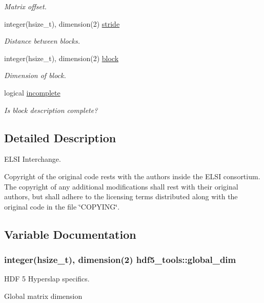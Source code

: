 \begin{DoxyCompactItemize}
\begin{DoxyCompactList}\small\item\em Matrix offset. \end{DoxyCompactList}\item 
\hypertarget{namespacehdf5__tools_ac27d32db7d4f517455a874f695763a58}{}integer(hsize\+\_\+t), dimension(2) \hyperlink{namespacehdf5__tools_ac27d32db7d4f517455a874f695763a58}{stride}\label{namespacehdf5__tools_ac27d32db7d4f517455a874f695763a58}

\begin{DoxyCompactList}\small\item\em Distance between blocks. \end{DoxyCompactList}\item 
\hypertarget{namespacehdf5__tools_a1bd5d44d2bbdd65cdbf723c7f3520999}{}integer(hsize\+\_\+t), dimension(2) \hyperlink{namespacehdf5__tools_a1bd5d44d2bbdd65cdbf723c7f3520999}{block}\label{namespacehdf5__tools_a1bd5d44d2bbdd65cdbf723c7f3520999}

\begin{DoxyCompactList}\small\item\em Dimension of block. \end{DoxyCompactList}\item 
\hypertarget{namespacehdf5__tools_adf2df1e36a8daa71e328d9988ea3e6c3}{}logical \hyperlink{namespacehdf5__tools_adf2df1e36a8daa71e328d9988ea3e6c3}{incomplete}\label{namespacehdf5__tools_adf2df1e36a8daa71e328d9988ea3e6c3}

\begin{DoxyCompactList}\small\item\em Is block description complete? \end{DoxyCompactList}\end{DoxyCompactItemize}


\subsection{Detailed Description}
E\+L\+S\+I Interchange. 

Copyright of the original code rests with the authors inside the E\+L\+S\+I consortium. The copyright of any additional modifications shall rest with their original authors, but shall adhere to the licensing terms distributed along with the original code in the file \char`\"{}\+C\+O\+P\+Y\+I\+N\+G\char`\"{}. 

\subsection{Variable Documentation}
\hypertarget{namespacehdf5__tools_afb5abe163ca047dcd5bd1cd1b3f6c1c9}{}
\subsubsection[{global\+\_\+dim}]{\setlength{\rightskip}{0pt plus 5cm}integer(hsize\+\_\+t), dimension(2) hdf5\+\_\+tools\+::global\+\_\+dim}\label{namespacehdf5__tools_afb5abe163ca047dcd5bd1cd1b3f6c1c9}


H\+D\+F 5 Hyperslap specifics. 

Global matrix dimension 